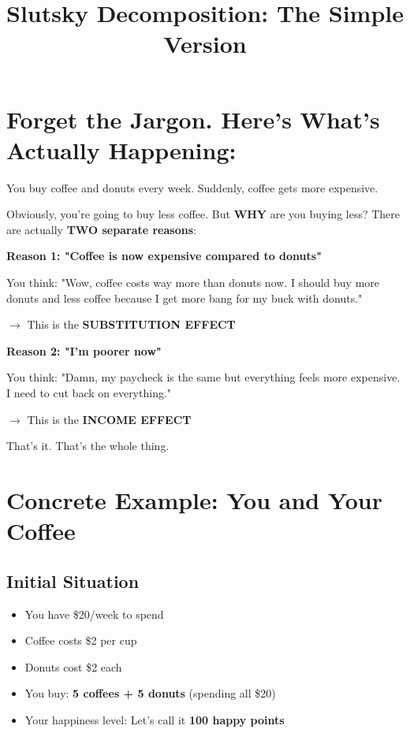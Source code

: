 \documentclass[12pt]{article}
\title{\textbf{Slutsky Decomposition: The Simple Version}}
\author{}
\date{}
\begin{document}
\maketitle

\section*{Forget the Jargon. Here's What's Actually Happening:}

You buy coffee and donuts every week. Suddenly, coffee gets more expensive.

Obviously, you're going to buy less coffee. But \textbf{WHY} are you buying less? There are actually \textbf{TWO separate reasons}:

\begin{tcolorbox}[colback=blue!5!white,colframe=blue!75!black]
\textbf{Reason 1: "Coffee is now expensive compared to donuts"}

You think: "Wow, coffee costs way more than donuts now. I should buy more donuts and less coffee because I get more bang for my buck with donuts."

\vspace{0.2cm}
$\rightarrow$ This is the \textbf{SUBSTITUTION EFFECT}
\end{tcolorbox}

\begin{tcolorbox}[colback=red!5!white,colframe=red!75!black]
\textbf{Reason 2: "I'm poorer now"}

You think: "Damn, my paycheck is the same but everything feels more expensive. I need to cut back on everything."

\vspace{0.2cm}
$\rightarrow$ This is the \textbf{INCOME EFFECT}
\end{tcolorbox}

That's it. That's the whole thing.

\section*{Concrete Example: You and Your Coffee}

\subsection*{Initial Situation}

\begin{itemize}[leftmargin=*]
\item You have \$20/week to spend
\item Coffee costs \$2 per cup
\item Donuts cost \$2 each
\item You buy: \textbf{5 coffees + 5 donuts} (spending all \$20)
\item Your happiness level: Let's call it \textbf{100 happy points}
\end{itemize}
\end{document}
